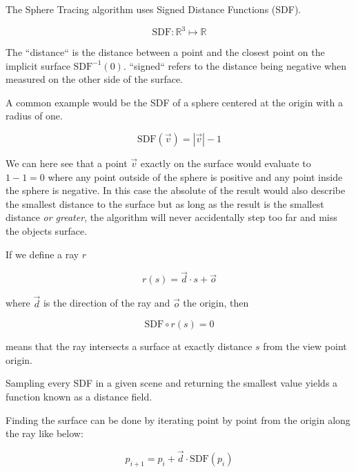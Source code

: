 		The Sphere Tracing algorithm uses Signed Distance Functions (SDF).
		
		$$\text{SDF}:\mathbb{R}^{3}\mapsto\mathbb{R}$$ 
		
		The ``distance`` is the distance between a point and the closest point on
		the implicit surface $\text{SDF}^{-1}(0)$. ``signed`` refers to the
		distance being negative when measured on the other side of the surface. 

		A common example would be the SDF of a sphere centered at the origin with a
		radius of one. 
		
		$$\text{SDF}(\vec{v}) = |\vec{v}| - 1$$
		
		We can here see that a point $\vec{v}$ exactly on the surface would
		evaluate to $1 - 1 = 0$ where any point outside of the sphere is positive
		and any point inside the sphere is negative. In this case the absolute of
		the result would also describe the smallest distance to the surface but as
		long as the result is the smallest distance \emph{or greater}, the
		algorithm will never accidentally step too far and miss the objects
		surface. 

		If we define a ray $r$ 
		
		$$r(s) = \vec{d} \cdot s + \vec{o}$$

		where $\vec{d}$ is the direction of the ray and $\vec{o}$ the origin, then
		
		$$\text{SDF}\circ r(s) = 0$$
		
		means that the ray intersects a surface at exactly distance $s$ from the
		view point origin. 
		

		Sampling every SDF in a given scene and returning the
		smallest value yields a function known as a distance field.


		\bigskip \noindent Finding the surface can be done by iterating point by
		point from the origin along the ray like below: 
		
		$$p_{i+1} = p_i + \vec{d}\cdot \text{SDF}(p_i)$$ 
		
